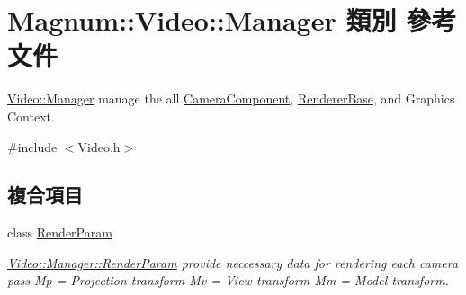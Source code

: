 \hypertarget{class_magnum_1_1_video_1_1_manager}{}\section{Magnum\+:\+:Video\+:\+:Manager 類別 參考文件}
\label{class_magnum_1_1_video_1_1_manager}


\hyperlink{class_magnum_1_1_video_1_1_manager}{Video\+::\+Manager} manage the all \hyperlink{class_magnum_1_1_camera_component}{Camera\+Component}, \hyperlink{class_magnum_1_1_renderer_base}{Renderer\+Base}, and Graphics Context.  




{\ttfamily \#include $<$Video.\+h$>$}

\subsection*{複合項目}
\begin{DoxyCompactItemize}
\item 
class \hyperlink{class_magnum_1_1_video_1_1_manager_1_1_render_param}{Render\+Param}
\begin{DoxyCompactList}\small\item\em \hyperlink{class_magnum_1_1_video_1_1_manager_1_1_render_param}{Video\+::\+Manager\+::\+Render\+Param} provide neccessary data for rendering each camera pass Mp = Projection transform Mv = View transform Mm = Model transform. \end{DoxyCompactList}\end{DoxyCompactItemize}
